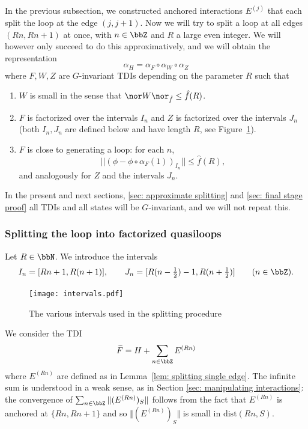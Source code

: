 In the previous subsection, we constructed anchored interactions $E^{(j)}$ that each split the loop at the edge $(j,j+1)$. 
Now we will try to split a loop at all edges $(Rn,Rn+1)$ at once, with  $n\in \bbZ$ and $R$ a large even integer.  We will however only succeed to do this approximatively, and we will obtain the representation
$$
\alpha_H=   \alpha_{F} \circ  \alpha_{W} \circ \alpha_Z
$$ 
where $F,W,Z$ are $G$-invariant TDIs depending on the parameter $R$ such that
\begin{enumerate}
	\item $W$ is small in the sense that $\nor W \nor_{\hat{f}}\leq \hat{f}(R)$.
	\item $F$ is factorized over the intervals $I_n$  and $Z$ is factorized over the intervals $J_n$ (both $I_n,J_n$ are defined below and  have length $R$, see Figure~\ref{fig: intervals}).
	\item $F$ is close to generating a loop: for each $n$, 
	$$||(\phi-\phi\circ\alpha_{F}(1))_{I_n}|| \leq \hat{f}(R), $$
	and analogously for $Z$ and the intervals $J_n$.
\end{enumerate}

In the present and next sections, \ref{sec: approximate splitting} and \ref{sec: final stage proof} all TDIs and all states will be $G$-invariant, and we will not repeat this.


\subsubsection{Splitting the loop into factorized quasiloops}\label{sec:factorized quasi-loops}

Let $R\in\bbN$. We introduce the intervals 
$$
I_n= [Rn+1,R(n+1)],\qquad   J_n= [R(n-\tfrac{1}{2})-1,R(n+\tfrac{1}{2})]\qquad(n\in \bbZ).
$$

\begin{figure}[htb]
	\begin{center}
		\texttt{[image: intervals.pdf]}
		\caption{The various intervals used in the splitting procedure}
		\label{fig: intervals}
	\end{center}
\end{figure}

We consider  the TDI 
\begin{equation}\label{F tilde}
	\widetilde F=H+\sum_{n \in \bbZ} E^{(Rn)}
\end{equation}
where $E^{(Rn)}$ are defined as in Lemma~\ref{lem: splitting single edge}. The infinite sum is understood in a weak sense, as in Section \ref{sec: manipulating interactions}: the convergence of $\sum_{n \in \bbZ} \Vert (E^{(Rn)})_S\Vert$ follows from the fact that $E^{(Rn)}$ is anchored at $\{Rn,Rn+1\}$ and so $\Vert (E^{(Rn)})_S\Vert$ is small in $\mathrm{dist}(Rn,S)$.

